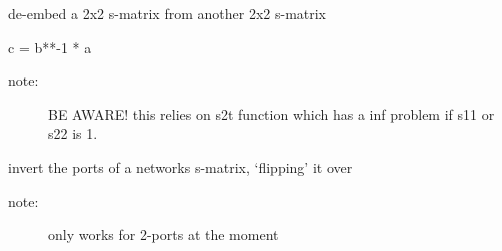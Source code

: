 \documentclass[letterpaper,10pt,english]{sphinxmanual}
\begin{document}
\begin{fulllineitems}
\label{api/mwavepy:mwavepy.network.de_embed}
de-embed a 2x2 s-matrix from another 2x2 s-matrix

c = b**-1 * a
\begin{description}
\item[{note:}] \leavevmode
BE AWARE! this relies on s2t function which has a inf problem 
if s11 or s22 is 1.

\end{description}

\end{fulllineitems}


\begin{fulllineitems}
\label{api/mwavepy:mwavepy.network.flip}
invert the ports of a networks s-matrix, `flipping' it over
\begin{description}
\item[{note:}] \leavevmode
only works for 2-ports at the moment

\end{description}

\end{fulllineitems}

\end{document}
